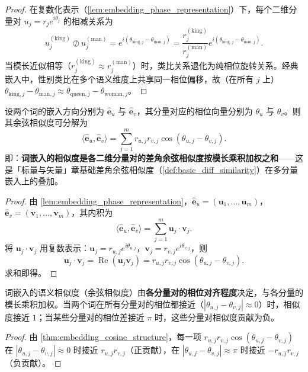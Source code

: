 \begin{proof}
在复数化表示（\cref{lem:embedding_phase_representation}）下，每个二维分量对 $u_j=r_je^{i\theta_j}$ 的相减关系为
\[
u_j^{(\text{king})}\oslash u_j^{(\text{man})}=e^{i(\theta_{\text{king},j}-\theta_{\text{man},j})}=\frac{r_j^{(\text{king})}}{r_j^{(\text{man})}}e^{i(\theta_{\text{king},j}-\theta_{\text{man},j})}.
\]
当模长近似相等（$r_j^{(\text{king})}\approx r_j^{(\text{man})}$）时，类比关系退化为纯相位旋转关系。经典嵌入中，性别类比在多个语义维度上共享同一相位偏移，故（在所有 $j$ 上）$\theta_{\text{king},j}-\theta_{\text{man},j}\approx\theta_{\text{queen},j}-\theta_{\text{woman},j}$。
\end{proof}

\begin{theorem}[嵌入方向差角的余弦相似度结构]\label{thm:embedding_cosine_structure}
设两个词的嵌入方向分别为 $\widehat{\mathbf{e}}_u$ 与 $\widehat{\mathbf{e}}_v$，其分量对应的相位向量分别为 $\theta_u$ 与 $\theta_v$。则其余弦相似度可分解为
\[
\langle\widehat{\mathbf{e}}_u,\widehat{\mathbf{e}}_v\rangle
=\sum_{j=1}^m r_{u,j}r_{v,j}\cos(\theta_{u,j}-\theta_{v,j}).
\]
即：\textbf{词嵌入的相似度是各二维分量对的差角余弦相似度按模长乘积加权之和}——这是「标量与矢量」章基础差角余弦相似度（\cref{def:basic_diff_similarity}）在多分量嵌入上的叠加。
\end{theorem}

\begin{proof}
由 \cref{lem:embedding_phase_representation}，$\widehat{\mathbf{e}}_u=(\mathbf{u}_1,\dots,\mathbf{u}_m)$，$\widehat{\mathbf{e}}_v=(\mathbf{v}_1,\dots,\mathbf{v}_m)$，其内积为
\[
\langle\widehat{\mathbf{e}}_u,\widehat{\mathbf{e}}_v\rangle
=\sum_{j=1}^m \mathbf{u}_j\cdot\mathbf{v}_j.
\]
将 $\mathbf{u}_j\cdot\mathbf{v}_j$ 用复数表示：$\mathbf{u}_j=r_{u,j}e^{i\theta_{u,j}}$，$\mathbf{v}_j=r_{v,j}e^{i\theta_{v,j}}$，则
\[
\mathbf{u}_j\cdot\mathbf{v}_j
=\operatorname{Re}(\mathbf{u}_j\overline{\mathbf{v}_j})
=r_{u,j}r_{v,j}\cos(\theta_{u,j}-\theta_{v,j}).
\]
求和即得。
\end{proof}

\begin{corollary}[语义相似度是相位相似度的加权和]\label{cor:semantic_phase_sum}
词嵌入的语义相似度（余弦相似度）由\textbf{各分量对的相位对齐程度}决定，与各分量的模长乘积加权。当两个词在所有分量对的相位都接近（$|\theta_{u,j}-\theta_{v,j}|\approx0$）时，相似度接近 $1$；当某些分量对的相位差接近 $\pi$ 时，这些分量对相似度贡献为负。
\end{corollary}

\begin{proof}
由 \cref{thm:embedding_cosine_structure}，每一项 $r_{u,j}r_{v,j}\cos(\theta_{u,j}-\theta_{v,j})$ 在 $|\theta_{u,j}-\theta_{v,j}|\approx0$ 时接近 $r_{u,j}r_{v,j}$（正贡献），在 $|\theta_{u,j}-\theta_{v,j}|\approx\pi$ 时接近 $-r_{u,j}r_{v,j}$（负贡献）。
\end{proof}

